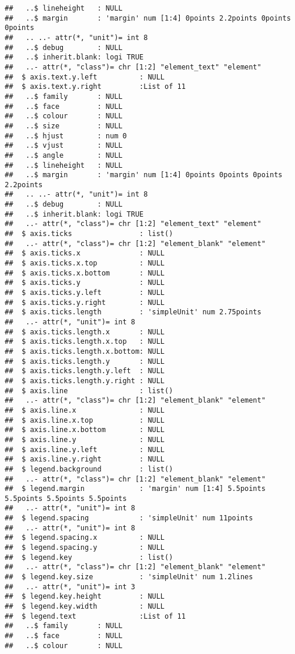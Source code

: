 \documentclass[
]{article}
\begin{document}
\begin{verbatim}
##   ..$ lineheight   : NULL
##   ..$ margin       : 'margin' num [1:4] 0points 2.2points 0points 0points
##   .. ..- attr(*, "unit")= int 8
##   ..$ debug        : NULL
##   ..$ inherit.blank: logi TRUE
##   ..- attr(*, "class")= chr [1:2] "element_text" "element"
##  $ axis.text.y.left          : NULL
##  $ axis.text.y.right         :List of 11
##   ..$ family       : NULL
##   ..$ face         : NULL
##   ..$ colour       : NULL
##   ..$ size         : NULL
##   ..$ hjust        : num 0
##   ..$ vjust        : NULL
##   ..$ angle        : NULL
##   ..$ lineheight   : NULL
##   ..$ margin       : 'margin' num [1:4] 0points 0points 0points 2.2points
##   .. ..- attr(*, "unit")= int 8
##   ..$ debug        : NULL
##   ..$ inherit.blank: logi TRUE
##   ..- attr(*, "class")= chr [1:2] "element_text" "element"
##  $ axis.ticks                : list()
##   ..- attr(*, "class")= chr [1:2] "element_blank" "element"
##  $ axis.ticks.x              : NULL
##  $ axis.ticks.x.top          : NULL
##  $ axis.ticks.x.bottom       : NULL
##  $ axis.ticks.y              : NULL
##  $ axis.ticks.y.left         : NULL
##  $ axis.ticks.y.right        : NULL
##  $ axis.ticks.length         : 'simpleUnit' num 2.75points
##   ..- attr(*, "unit")= int 8
##  $ axis.ticks.length.x       : NULL
##  $ axis.ticks.length.x.top   : NULL
##  $ axis.ticks.length.x.bottom: NULL
##  $ axis.ticks.length.y       : NULL
##  $ axis.ticks.length.y.left  : NULL
##  $ axis.ticks.length.y.right : NULL
##  $ axis.line                 : list()
##   ..- attr(*, "class")= chr [1:2] "element_blank" "element"
##  $ axis.line.x               : NULL
##  $ axis.line.x.top           : NULL
##  $ axis.line.x.bottom        : NULL
##  $ axis.line.y               : NULL
##  $ axis.line.y.left          : NULL
##  $ axis.line.y.right         : NULL
##  $ legend.background         : list()
##   ..- attr(*, "class")= chr [1:2] "element_blank" "element"
##  $ legend.margin             : 'margin' num [1:4] 5.5points 5.5points 5.5points 5.5points
##   ..- attr(*, "unit")= int 8
##  $ legend.spacing            : 'simpleUnit' num 11points
##   ..- attr(*, "unit")= int 8
##  $ legend.spacing.x          : NULL
##  $ legend.spacing.y          : NULL
##  $ legend.key                : list()
##   ..- attr(*, "class")= chr [1:2] "element_blank" "element"
##  $ legend.key.size           : 'simpleUnit' num 1.2lines
##   ..- attr(*, "unit")= int 3
##  $ legend.key.height         : NULL
##  $ legend.key.width          : NULL
##  $ legend.text               :List of 11
##   ..$ family       : NULL
##   ..$ face         : NULL
##   ..$ colour       : NULL

\end{verbatim}
\end{document}
